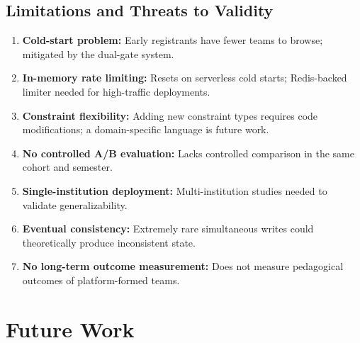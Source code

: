 \documentclass[12pt,a4paper]{article}
\begin{document}
\subsection{Limitations and Threats to Validity}

\begin{enumerate}[noitemsep,topsep=3pt]
    \item \textbf{Cold-start problem:} Early registrants have fewer teams to browse; mitigated by the dual-gate system.
    \item \textbf{In-memory rate limiting:} Resets on serverless cold starts; Redis-backed limiter needed for high-traffic deployments.
    \item \textbf{Constraint flexibility:} Adding new constraint types requires code modifications; a domain-specific language is future work.
    \item \textbf{No controlled A/B evaluation:} Lacks controlled comparison in the same cohort and semester.
    \item \textbf{Single-institution deployment:} Multi-institution studies needed to validate generalizability.
    \item \textbf{Eventual consistency:} Extremely rare simultaneous writes could theoretically produce inconsistent state.
    \item \textbf{No long-term outcome measurement:} Does not measure pedagogical outcomes of platform-formed teams.
\end{enumerate}

\section{Future Work}
\end{document}
